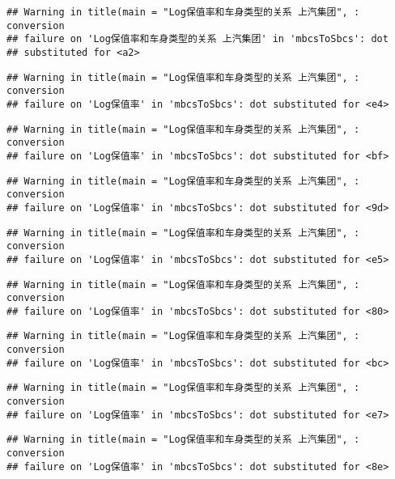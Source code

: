\documentclass[]{article}
\begin{document}
\begin{verbatim}
## Warning in title(main = "Log保值率和车身类型的关系 上汽集团", : conversion
## failure on 'Log保值率和车身类型的关系 上汽集团' in 'mbcsToSbcs': dot
## substituted for <a2>
\end{verbatim}

\begin{verbatim}
## Warning in title(main = "Log保值率和车身类型的关系 上汽集团", : conversion
## failure on 'Log保值率' in 'mbcsToSbcs': dot substituted for <e4>
\end{verbatim}

\begin{verbatim}
## Warning in title(main = "Log保值率和车身类型的关系 上汽集团", : conversion
## failure on 'Log保值率' in 'mbcsToSbcs': dot substituted for <bf>
\end{verbatim}

\begin{verbatim}
## Warning in title(main = "Log保值率和车身类型的关系 上汽集团", : conversion
## failure on 'Log保值率' in 'mbcsToSbcs': dot substituted for <9d>
\end{verbatim}

\begin{verbatim}
## Warning in title(main = "Log保值率和车身类型的关系 上汽集团", : conversion
## failure on 'Log保值率' in 'mbcsToSbcs': dot substituted for <e5>
\end{verbatim}

\begin{verbatim}
## Warning in title(main = "Log保值率和车身类型的关系 上汽集团", : conversion
## failure on 'Log保值率' in 'mbcsToSbcs': dot substituted for <80>
\end{verbatim}

\begin{verbatim}
## Warning in title(main = "Log保值率和车身类型的关系 上汽集团", : conversion
## failure on 'Log保值率' in 'mbcsToSbcs': dot substituted for <bc>
\end{verbatim}

\begin{verbatim}
## Warning in title(main = "Log保值率和车身类型的关系 上汽集团", : conversion
## failure on 'Log保值率' in 'mbcsToSbcs': dot substituted for <e7>
\end{verbatim}

\begin{verbatim}
## Warning in title(main = "Log保值率和车身类型的关系 上汽集团", : conversion
## failure on 'Log保值率' in 'mbcsToSbcs': dot substituted for <8e>
\end{verbatim}
\end{document}
